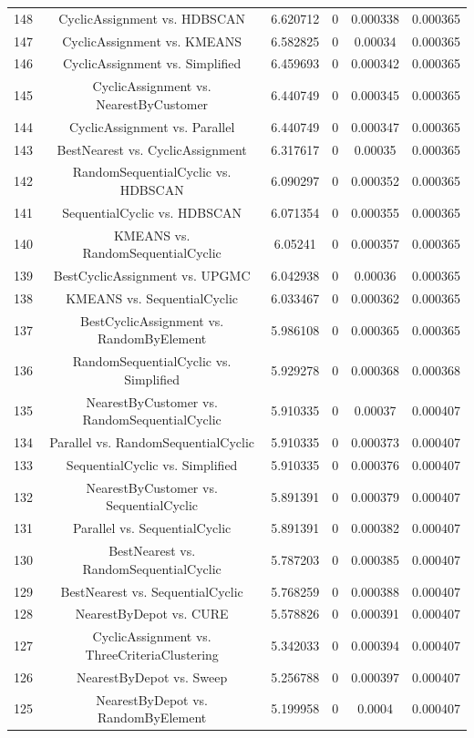 \documentclass[a4paper,10pt]{article}
\begin{document}
\begin{landscape}
\begin{table}[!htp]
\begin{tabular}{cccccc}
148&CyclicAssignment vs. HDBSCAN&6.620712&0&0.000338&0.000365\\
147&CyclicAssignment vs. KMEANS&6.582825&0&0.00034&0.000365\\
146&CyclicAssignment vs. Simplified&6.459693&0&0.000342&0.000365\\
145&CyclicAssignment vs. NearestByCustomer&6.440749&0&0.000345&0.000365\\
144&CyclicAssignment vs. Parallel&6.440749&0&0.000347&0.000365\\
143&BestNearest vs. CyclicAssignment&6.317617&0&0.00035&0.000365\\
142&RandomSequentialCyclic vs. HDBSCAN&6.090297&0&0.000352&0.000365\\
141&SequentialCyclic vs. HDBSCAN&6.071354&0&0.000355&0.000365\\
140&KMEANS vs. RandomSequentialCyclic&6.05241&0&0.000357&0.000365\\
139&BestCyclicAssignment vs. UPGMC&6.042938&0&0.00036&0.000365\\
138&KMEANS vs. SequentialCyclic&6.033467&0&0.000362&0.000365\\
137&BestCyclicAssignment vs. RandomByElement&5.986108&0&0.000365&0.000365\\
136&RandomSequentialCyclic vs. Simplified&5.929278&0&0.000368&0.000368\\
135&NearestByCustomer vs. RandomSequentialCyclic&5.910335&0&0.00037&0.000407\\
134&Parallel vs. RandomSequentialCyclic&5.910335&0&0.000373&0.000407\\
133&SequentialCyclic vs. Simplified&5.910335&0&0.000376&0.000407\\
132&NearestByCustomer vs. SequentialCyclic&5.891391&0&0.000379&0.000407\\
131&Parallel vs. SequentialCyclic&5.891391&0&0.000382&0.000407\\
130&BestNearest vs. RandomSequentialCyclic&5.787203&0&0.000385&0.000407\\
129&BestNearest vs. SequentialCyclic&5.768259&0&0.000388&0.000407\\
128&NearestByDepot vs. CURE&5.578826&0&0.000391&0.000407\\
127&CyclicAssignment vs. ThreeCriteriaClustering&5.342033&0&0.000394&0.000407\\
126&NearestByDepot vs. Sweep&5.256788&0&0.000397&0.000407\\
125&NearestByDepot vs. RandomByElement&5.199958&0&0.0004&0.000407\\

\end{tabular}
\end{table}
\end{landscape}
\end{document}
